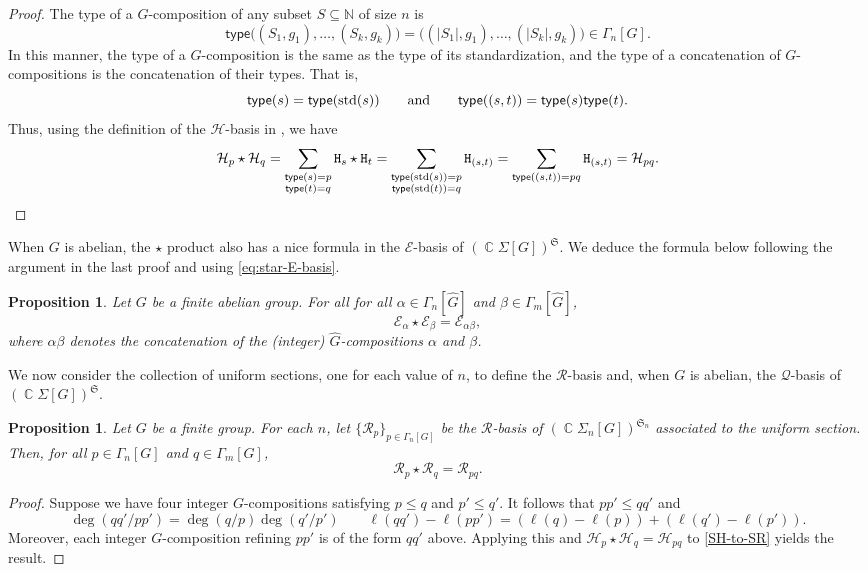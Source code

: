 \documentclass[11pt, oneside, reqno]{amsart}
\newtheorem{prop}[theorem]{Proposition}
\theoremstyle{definition}
\numberwithin{equation}{section}
\DeclareMathOperator{\C}{\mathbb{C}}
\def \kk{\C}
\def \sym{\mathfrak{S}}
\def \wh{\widehat}
\def \gsetcomposition{{\Sigma_n[G]}}
\def \gcomposition{{\Gamma_n[G]}}
\def \hsiao {{\gsetcomposition}}
\def\qqand{\qquad\text{and}\qquad}
\def \type{\mathsf{type}}
\newcommand{\B}[1]{\mathtt{#1}} 			%
\newcommand{\SB}[1]{\mathcal{#1}} 		%
\begin{document}
\begin{proof}
    The type of a $G$-composition of any subset $S \subseteq \mathbb{N}$ of size $n$ is
    \[
        \type\big( (S_1,g_1),\dots,(S_k,g_k) \big) = \big( (|S_1|,g_1),\dots,(|S_k|,g_k) \big) \in \gcomposition.
    \]
    In this manner, the type of a $G$-composition is the same as the type of its standardization,
    and the type of a concatenation of $G$-compositions is the concatenation of their types.
    That is,
    \[ 
        \type(s) = \type({\rm std}(s))
        \qqand
        \type((s,t)) = \type(s)\type(t).
    \]
    Thus, using the definition of the $\SB{H}$-basis in , we have
    \[
        \SB{H}_p \star \SB{H}_q = 
        \sum_{ \substack{ \type(s) = p \\ \type(t) = q } } \B{H}_s \star \B{H}_t =
        \sum_{ \substack{ \type({\rm std}(s)) = p \\ \type({\rm std}(t)) = q } } \B{H}_{(s,t)} =
        \sum_{ \type((s,t)) = p q } \B{H}_{(s,t)} = 
        \SB{H}_{p q}. \qedhere
    \]
\end{proof}

When $G$ is abelian, the $\star$ product also has a nice formula in the $\SB{E}$-basis of $(\kk \Sigma[G])^{\sym}$.
We deduce the formula below following the argument in the last proof and using \cref{eq:star-E-basis}.

\begin{prop}
   Let $G$ be a finite abelian group.
    For all for all $\alpha \in \Gamma_n[\wh{G}]$ and $\beta \in \Gamma_m[\wh{G}]$,
    \[
        \SB{E}_\alpha \star \SB{E}_\beta = \SB{E}_{\alpha\beta},
    \]
    where $\alpha\beta$ denotes the concatenation of the (integer) $\wh{G}$-compositions $\alpha$ and $\beta$.
\end{prop}

We now consider the collection of uniform sections, one for each value of $n$, to define the $\SB{R}$-basis and, when $G$ is abelian, the $\SB{Q}$-basis of $(\kk \Sigma[G])^{\sym}$.

\begin{prop}
    Let $G$ be a finite group.
    For each $n$, let $\{\SB{R}_p\}_{p \in \Gamma_n[{G}]}$ be the $\SB{R}$-basis of $(\kk\hsiao)^{\sym_n}$ associated to the uniform section.
    Then, for all $p \in \Gamma_n[{G}]$ and $q \in \Gamma_m[{G}]$,
    \[
        \SB{R}_p \star \SB{R}_q = \SB{R}_{pq}.
    \]
\end{prop}

\begin{proof}
    Suppose we have four integer ${G}$-compositions satisfying $p \leq q$ and $p' \leq q'$.
    It follows that $p p' \leq q q'$ and
    \[
        \deg(q q' / p p') = \deg(q / p) \deg(q' / p')
        \qquad
        \ell(q q') - \ell(p p') = 
        (\ell(q) - \ell(p)) + (\ell(q') - \ell(p')).
    \]
    Moreover, each integer ${G}$-composition refining $p p'$ is of the form $q q'$ above.
    Applying this and $\SB{H}_p \star \SB{H}_q = \SB{H}_{pq}$ to \cref{SH-to-SR} yields the result.
\end{proof}
\end{document}
